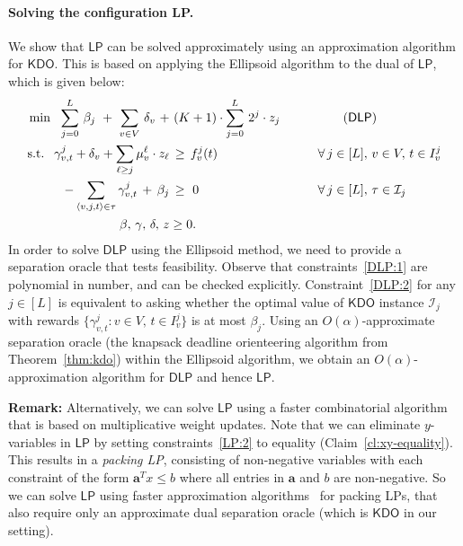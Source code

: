 \documentclass[11pt,letterpaper]{article}
\numberwithin{algorithm}{section}
\newcommand{\I}{{\mathcal{I}}}
\newcommand{\kdo}{\ensuremath{\mathsf{KDO}}\xspace}
\newcommand{\lp}{\ensuremath{\mathsf{LP}}\xspace}
\newcommand{\dlp}{\ensuremath{\mathsf{DLP}}\xspace}
\begin{document}
\paragraph{Solving the configuration LP.} We show that \lp  can be solved approximately using an approximation algorithm for \kdo. This is based on applying the Ellipsoid algorithm to the dual of \lp, which is given below:
\begin{alignat}{2}
  \mbox{min } \,\, \sum_{j=0}^L \, \beta_j \,\,+\,\, \sum_{v \in V}  \,\delta_v \,\, +  & \,\, (K+1)\cdot \sum_{j=0}^L \, 2^j\cdot z_j & & \label{DLP:0} \tag{\dlp}  \\
  \mbox{s.t. } \,\, \gamma^j_{v,t} + \delta_v + \sum_{\ell\ge j} \mu^\ell_v\cdot z_\ell &  \, \ge  \, f^j_v(t) & \qquad & \forall \, j \in [L], \, v\in V,\, t\in I^j_v   \label{DLP:1} \\
  -\sum_{\langle v,j,t\rangle\in \tau} \gamma^j_{v,t} \,+\, \beta_j & \, \geq  \,  \, 0 & \qquad & \forall \, j\in [L],\, \tau \in
\I_j \label{DLP:2} \\
  \mathbf{\beta},\,\mathbf{\gamma},\, \mathbf{\delta},\, z &\geq 0. & & \label{DLP:3}
\end{alignat}
In order to solve \dlp using the Ellipsoid method, we need to provide a separation oracle that tests feasibility. Observe that constraints~\eqref{DLP:1} are polynomial in number, and can be checked explicitly. Constraint~\eqref{DLP:2} for any $j\in[L]$ is equivalent to asking whether the optimal value of \kdo instance $\I_j$ with rewards $\{\gamma^j_{v,t} : v\in V,\, t\in I^j_v\}$ is at most $\beta_j$. Using an $O(\alpha)$-approximate separation oracle (the knapsack deadline orienteering algorithm from Theorem~\ref{thm:kdo}) within the Ellipsoid algorithm, we obtain an $O(\alpha)$-approximation algorithm for \dlp and hence \lp.

{\bf Remark:} Alternatively, we can solve \lp using a faster combinatorial algorithm that is based on multiplicative weight updates. Note that we can eliminate $y$-variables in \lp by setting constraints~\eqref{LP:2} to equality (Claim~\ref{cl:xy-equality}). This results in a {\em packing LP}, consisting of  non-negative variables with each constraint of the form $\mathbf{a}^T x \le b$ where all entries in $\mathbf{a}$ and $b$ are non-negative. So we can solve \lp using faster approximation algorithms~\cite{PST91,GK07} for packing LPs, that also require only an approximate dual separation oracle (which is \kdo in our setting).
\end{document}
